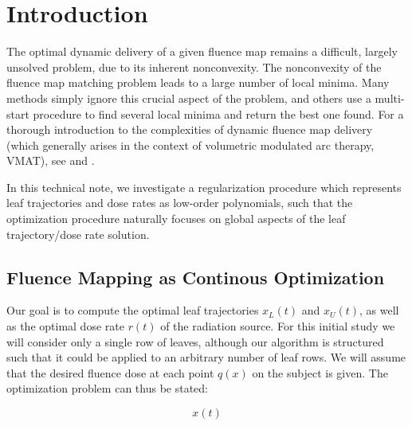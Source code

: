 \section{Introduction}
The optimal dynamic delivery of a given fluence map remains a difficult, largely unsolved problem, due to its inherent nonconvexity.
The nonconvexity of the fluence map matching problem leads to a large number of local minima. Many methods simply ignore this crucial aspect
of the problem, and others use a multi-start procedure to find several local minima and return the best one found. For a thorough introduction
to the complexities of dynamic fluence map delivery (which generally arises in the context of volumetric modulated arc therapy, VMAT),
see \cite{balvertcraft} and \cite{unkvmatreview}.

In this technical note, we investigate a regularization procedure which represents leaf trajectories and dose rates as low-order polynomials,
such that the optimization procedure naturally focuses on global aspects of the leaf trajectory/dose rate solution.


\subsection{Fluence Mapping as Continous Optimization}

Our goal is to compute the optimal leaf trajectories $x_L(t)$ and $x_U(t)$, as well as the optimal dose rate $r(t)$ of the radiation source.
For this initial study we will consider only a single row of leaves,
although our algorithm is structured such that it could be applied to an arbitrary number of leaf rows.
We will assume that the desired fluence dose at each point $q(x)$ on the subject is given.
The optimization problem can thus be stated:

\begin{equation}
x(t)
\end{equation}
